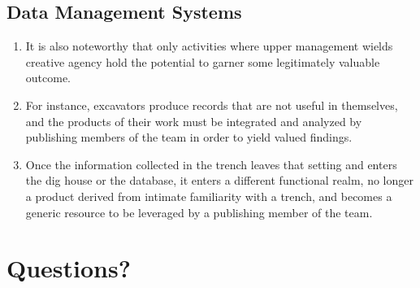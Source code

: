 \documentclass{article}
\begin{document}
\subsection{Data Management Systems}
\begin{enumerate}
  \item It is also noteworthy that only activities where upper management wields creative agency hold the potential to garner some legitimately valuable outcome.
  \item For instance, excavators produce records that are not useful in themselves, and the products of their work must be integrated and analyzed by publishing members of the team in order to yield valued findings.
  \item Once the information collected in the trench leaves that setting and enters the dig house or the database, it enters a different functional realm, no longer a product derived from intimate familiarity with a trench, and becomes a generic resource to be leveraged by a publishing member of the team.
\end{enumerate}


\section{Questions?}
\end{document}
